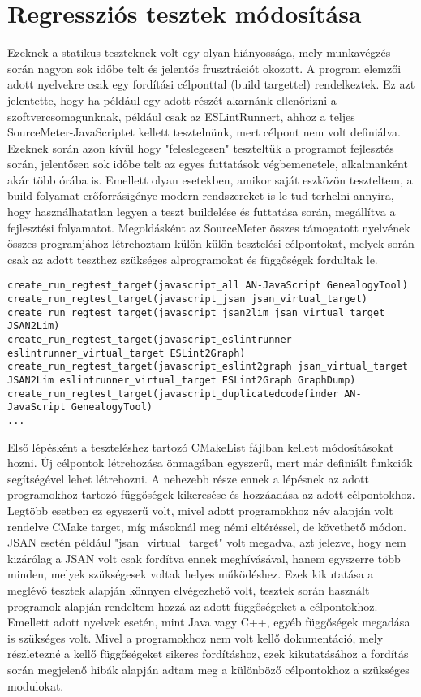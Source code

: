 \section{Regressziós tesztek módosítása}

Ezeknek a statikus teszteknek volt egy olyan hiányossága, mely munkavégzés során nagyon sok időbe telt és jelentős frusztrációt okozott. A program elemzői adott nyelvekre csak egy fordítási célponttal (build targettel) rendelkeztek. Ez azt jelentette, hogy ha például egy adott részét akarnánk ellenőrizni a szoftvercsomagunknak, például csak az ESLintRunnert, ahhoz a teljes SourceMeter-JavaScriptet kellett tesztelnünk, mert célpont nem volt definiálva. Ezeknek során azon kívül hogy "feleslegesen" teszteltük a programot fejlesztés során, jelentősen sok időbe telt az egyes futtatások végbemenetele, alkalmanként akár több órába is. Emellett olyan esetekben, amikor saját eszközön teszteltem, a build folyamat erőforrásigénye modern rendszereket is le tud terhelni annyira, hogy használhatatlan legyen a teszt buildelése és futtatása során, megállítva a fejlesztési folyamatot.
Megoldásként az SourceMeter összes támogatott nyelvének összes programjához létrehoztam külön-külön tesztelési célpontokat, melyek során csak az adott teszthez szükséges alprogramokat és függőségek fordultak le.

\begin{lstlisting}[caption={CMake célpontok JavaScript teszteléshez},label={lst:abs-computedfiltering}, style={CStyle}]
create_run_regtest_target(javascript_all AN-JavaScript GenealogyTool)
create_run_regtest_target(javascript_jsan jsan_virtual_target)
create_run_regtest_target(javascript_jsan2lim jsan_virtual_target JSAN2Lim)
create_run_regtest_target(javascript_eslintrunner eslintrunner_virtual_target ESLint2Graph)
create_run_regtest_target(javascript_eslint2graph jsan_virtual_target JSAN2Lim eslintrunner_virtual_target ESLint2Graph GraphDump)
create_run_regtest_target(javascript_duplicatedcodefinder AN-JavaScript GenealogyTool)
...
\end{lstlisting}
    
Első lépésként a teszteléshez tartozó CMakeList fájlban kellett módosításokat hozni. Új célpontok létrehozása önmagában egyszerű, mert már definiált funkciók segítségével lehet létrehozni. A nehezebb része ennek a lépésnek az adott programokhoz tartozó függőségek kikeresése és hozzáadása az adott célpontokhoz. Legtöbb esetben ez egyszerű volt, mivel adott programokhoz név alapján volt rendelve CMake target, míg másoknál meg némi eltéréssel, de követhető módon. JSAN esetén például "jsan\_virtual\_target" volt megadva, azt jelezve, hogy nem kizárólag a JSAN volt csak fordítva ennek meghívásával, hanem egyszerre több minden, melyek szükségesek voltak helyes működéshez. Ezek kikutatása a meglévő tesztek alapján könnyen elvégezhető volt, tesztek során használt programok alapján rendeltem hozzá az adott függőségeket a célpontokhoz. Emellett adott nyelvek esetén, mint Java vagy C++, egyéb függőségek megadása is szükséges volt. Mivel a programokhoz nem volt kellő dokumentáció, mely részletezné a kellő függőségeket sikeres fordításhoz, ezek kikutatásához a fordítás során megjelenő hibák alapján adtam meg a különböző célpontokhoz a szükséges modulokat. 

